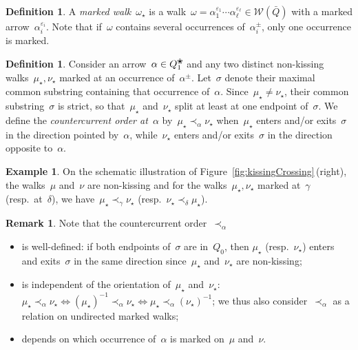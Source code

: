 \documentclass{amsart}
\theoremstyle{definition}
\newtheorem{definition}[theorem]{Definition}
\newtheorem{example}[theorem]{Example}
\newtheorem{remark}[theorem]{Remark}
\newcommand{\fref}[1]{Figure~\ref{#1}} %
\newcommand{\darkblue}{\color{darkblue}} %
\newcommand{\defn}[1]{\textsl{\darkblue #1}} %
\newcommand{\blossom}{^\text{\ding{96}}} %
\newcommand{\walks}{\mathcal{W}} %
\begin{document}
\begin{definition}
A \defn{marked walk}~$\omega_\star$ is a walk~$\omega = \alpha_1^{\varepsilon_1} \cdots \alpha_\ell^{\varepsilon_\ell} \in \walks(\bar Q)$ with a marked arrow~$\alpha_i^{\varepsilon_i}$.
Note that if~$\omega$ contains several occurrences of~$\alpha_i^\pm$, only one occurrence is marked.
\end{definition}

\begin{definition}
Consider an arrow~$\alpha \in Q\blossom_1$ and any two distinct non-kissing walks~$\mu_\star, \nu_\star$ marked at an occurrence of~$\alpha^\pm$.
Let~$\sigma$ denote their maximal common substring containing that occurrence of~$\alpha$.
Since~$\mu_\star \ne \nu_\star$, their common substring~$\sigma$ is strict, so that~$\mu_\star$ and~$\nu_\star$ split at least at one endpoint of~$\sigma$.
We define the \defn{countercurrent order at~$\alpha$} by~$\mu_\star \prec_\alpha \nu_\star$ when~$\mu_\star$ enters and/or exits~$\sigma$ in the direction pointed by~$\alpha$, while~$\nu_\star$ enters and/or exits~$\sigma$ in the direction opposite to~$\alpha$.
\end{definition}

\begin{example}
On the schematic illustration of \fref{fig:kissingCrossing}\,(right), the walks~$\mu$ and~$\nu$ are non-kissing and for the walks~$\mu_\star, \nu_\star$ marked at~$\gamma$ (resp.~at~$\delta$), we have~$\mu_\star \prec_\gamma \nu_\star$ (resp.~$\nu_\star \prec_\delta \mu_\star$).
\end{example}

\begin{remark}
Note that the countercurrent order~$\prec_\alpha$
\begin{itemize}
\item is well-defined: if both endpoints of~$\sigma$ are in~$Q_0$, then $\mu_\star$ (resp.~$\nu_\star$) enters and exits~$\sigma$ in the same direction since~$\mu_\star$ and~$\nu_\star$ are non-kissing;
\item is independent of the orientation of~$\mu_\star$ and~$\nu_\star$:~${\mu_\star \prec_\alpha \nu_\star \!\iff\! (\mu_\star)^{-1} \prec_\alpha \nu_\star \!\iff\! \mu_\star \prec_\alpha (\nu_\star)^{-1}}$; we thus also consider~$\prec_\alpha$ as a relation on undirected marked walks;
\item depends on which occurrence of~$\alpha$ is marked on~$\mu$ and~$\nu$.
\end{itemize}
\end{remark}
\end{document}
